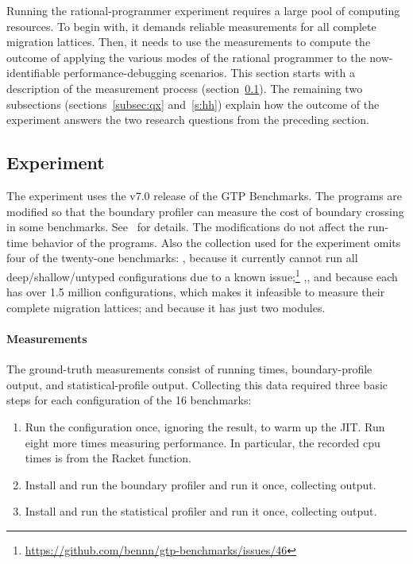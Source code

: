 \newcommand{\numgtp}{16}
\newcommand{\boundaryMB}{536} %
\newcommand{\statisticalMB}{4645} %
\newcommand{\runtimeMB}{44}

Running the rational-programmer experiment requires a large pool of computing
resources.  To begin with, it demands reliable measurements for all complete
migration lattices. Then, it needs to use the measurements to compute the
outcome of applying the various modes of the rational programmer to the
now-identifiable performance-debugging scenarios. This section starts with a
description of the measurement process (section~\ref{subsec:experiment}). The
remaining two subsections (sections~\ref{subsec:qx} and~\ref{s:hh}) explain how
the outcome of the experiment answers the two research questions from the
preceding section.

\subsection{Experiment} \label{subsec:experiment} \label{sec:data}

The experiment uses the v7.0 release of the GTP Benchmarks. The programs are
modified so that the boundary profiler can measure the cost of boundary crossing
in some benchmarks.
See~ for details.
The modifications do not affect the run-time behavior of the programs.  Also the
collection used for the experiment omits four of the twenty-one benchmarks:
, because it currently cannot run all deep/shallow/untyped
configurations due to a known issue;\footnote{
\url{https://github.com/bennn/gtp-benchmarks/issues/46}}
,, and  because each has over 1.5
million configurations, which makes it infeasible to measure their complete
migration lattices; and  because it has just two modules.

\paragraph{Measurements} 

The ground-truth measurements consist of running times, boundary-profile output,
and statistical-profile output.  Collecting this data required three basic steps
for each configuration of the \numgtp{} benchmarks:
\begin{enumerate}

\item Run the configuration once, ignoring the result, to warm up the JIT.  Run
    eight more times measuring performance.  In particular, the recorded {cpu
    time}s is from the Racket  function.

\item Install and run the boundary profiler and run it once, collecting output.

\item Install and run the statistical profiler and run it once, collecting
output.

\end{enumerate}

